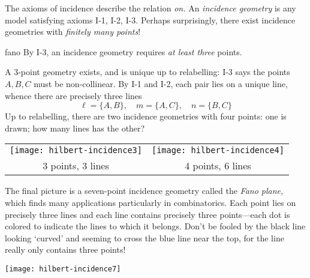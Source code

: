 \pagebreak



The axioms of incidence describe the relation \emph{on.} An \emph{incidence geometry} is any model satisfying axioms I-1, I-2, I-3. Perhaps surprisingly, there exist incidence geometries with \emph{finitely many points}!

\begin{examples}{}{fano}
	By I-3, an incidence geometry requires \emph{at least three} points.\par
	\begin{minipage}[t]{0.62\linewidth}\vspace{-5pt}
		A 3-point geometry exists, and is unique up to relabelling:\smallbreak
		I-3 says the points $A,B,C$ must be non-collinear. By I-1 and I-2, each pair lies on a unique line, whence there are precisely three lines
		\[
			\ell=\{A,B\},\quad m=\{A,C\},\quad n=\{B,C\}
		\]
		Up to relabelling, there are two incidence geometries with four points: one is drawn; how many lines has the other?
	\end{minipage}
	\hfill
	\begin{minipage}[t]{0.37\linewidth}\vspace{-15pt}
		\flushright
		\begin{tabular}{cc@{}}
			\texttt{[image: hilbert-incidence3]}
			&
			\texttt{[image: hilbert-incidence4]}\\
			3 points, 3 lines
			&
			4 points, 6 lines%
		\end{tabular}
	\end{minipage}
	\smallbreak
	\begin{minipage}[t]{0.72\linewidth}\vspace{0pt}
		The final picture is a seven-point incidence geometry called the \emph{Fano plane,} which finds many applications particularly in combinatorics. Each point lies on precisely three lines and each line contains precisely three points---each dot is colored to indicate the lines to which it belongs. Don't be fooled by the black line looking `curved' and seeming to cross the blue line near the top, for the line really only contains three points!
	\end{minipage}
	\hfill
	\begin{minipage}[t]{0.27\linewidth}\vspace{-17pt}
		\flushright
		\texttt{[image: hilbert-incidence7]}
	\end{minipage}
\end{examples}

